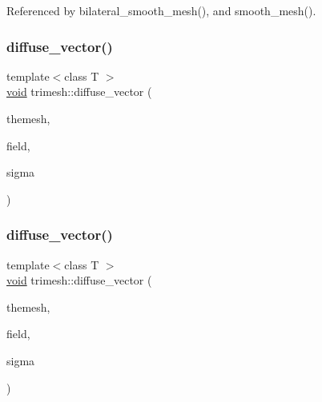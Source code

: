 Referenced by bilateral\+\_\+smooth\+\_\+mesh(), and smooth\+\_\+mesh().

\mbox{\label{namespacetrimesh_a8fa6ac94a71d33cb6e11c29e76501519}} 
\subsubsection{\texorpdfstring{diffuse\+\_\+vector()}{diffuse\_vector()}\hspace{0.1cm}{\footnotesize\ttfamily [1/2]}}
{\footnotesize\ttfamily template$<$class T $>$ \\
\hyperlink{namespacetrimesh_a784ddfd979e1c579bda795a8edfc3f43}{void} trimesh\+::diffuse\+\_\+vector (\begin{DoxyParamCaption}\item[{\hyperlink{classtrimesh_1_1TriMesh}{Tri\+Mesh} $\ast$}]{themesh,  }\item[{\+::std\+::vector$<$ T $>$ \&}]{field,  }\item[{float}]{sigma }\end{DoxyParamCaption})}

\mbox{\label{namespacetrimesh_aa523883de851df1f1ecb2e2d26156c84}} 
\subsubsection{\texorpdfstring{diffuse\+\_\+vector()}{diffuse\_vector()}\hspace{0.1cm}{\footnotesize\ttfamily [2/2]}}
{\footnotesize\ttfamily template$<$class T $>$ \\
\hyperlink{namespacetrimesh_a784ddfd979e1c579bda795a8edfc3f43}{void} trimesh\+::diffuse\+\_\+vector (\begin{DoxyParamCaption}\item[{\hyperlink{classtrimesh_1_1TriMesh}{Tri\+Mesh} $\ast$}]{themesh,  }\item[{std\+::vector$<$ T $>$ \&}]{field,  }\item[{float}]{sigma }\end{DoxyParamCaption})}

\mbox{\label{namespacetrimesh_a7c2e73fadf50bd3d2a431aa7e5924fd2}} 
